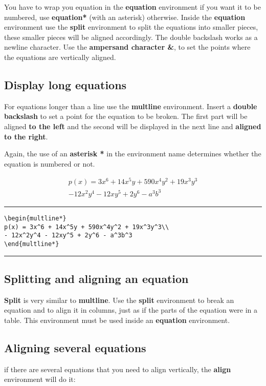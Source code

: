You have to wrap you equation in the \textbf{equation} environment if you want it to be numbered, use \textbf{equation*} (with an asterisk) otherwise. Inside the \textbf{equation} environment use the \textbf{split} environment to split the equations into smaller pieces, these smaller pieces will be aligned accordingly. The double backslash works as a newline character. Use the \textbf{ampersand character \&}, to set the points where the equations are vertically aligned.

\subsection{Display long equations}
For equations longer than a line use the \textbf{multline} environment. Insert a \textbf{double backslash} to set a point for the equation to be broken. The first part will be aligned \textbf{to the left} and the second will be displayed in the next line and \textbf{aligned to the right}.

Again, the use of an \textbf{asterisk *} in the environment name determines whether the equation is numbered or not.

\begin{multline*}
p(x) = 3x^6 + 14x^5y + 590x^4y^2 + 19x^3y^3\\ 
- 12x^2y^4 - 12xy^5 + 2y^6 - a^3b^3
\end{multline*}

\noindent\vspace{1em}\hrule
\begin{verbatim}
\begin{multline*}
p(x) = 3x^6 + 14x^5y + 590x^4y^2 + 19x^3y^3\\ 
- 12x^2y^4 - 12xy^5 + 2y^6 - a^3b^3
\end{multline*}
\end{verbatim}
\noindent\hrule\vspace{1em}

\subsection{Splitting and aligning an equation}
\textbf{Split} is very similar to \textbf{multline}. Use the \textbf{split} environment to break an equation and to align it in columns, just as if the parts of the equation were in a table. This environment must be used inside an \textbf{equation} environment.

\subsection{Aligning several equations}
if there are several equations that you need to align vertically, the \textbf{align} environment will do it:

